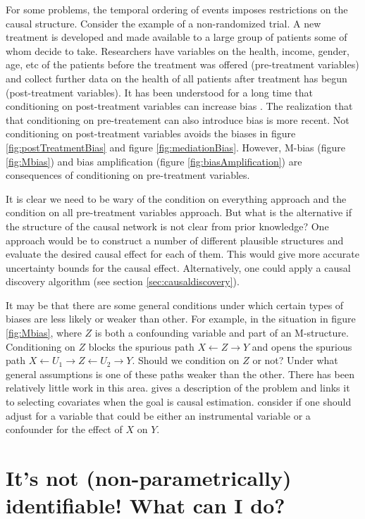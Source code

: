 \documentclass[11pt,a4paper]{article}
\begin{document}
For some problems, the temporal ordering of events imposes restrictions on the causal structure. Consider the example of a non-randomized trial. A new treatment is developed and made available to a large group of patients some of whom decide to take. Researchers have variables on the health, income, gender, age, etc of the patients before the treatment was offered (pre-treatment variables) and collect further data on the health of all patients after treatment has begun (post-treatment variables). It has been understood for a long time that conditioning on post-treatment variables can increase bias \cite{Rosenbaum1984a}. The realization that that conditioning on pre-treatement can also introduce bias is more recent. Not conditioning on post-treatment variables avoids the biases in figure \ref{fig:postTreatmentBias} and figure \ref{fig:mediationBias}. However, M-bias (figure \ref{fig:Mbias}) and bias amplification (figure \ref{fig:biasAmplification}) are consequences of conditioning on pre-treatment variables. 


It is clear we need to be wary of the condition on everything approach and the condition on all pre-treatment variables approach. But what is the alternative if the structure of the causal network is not clear from prior knowledge? One approach would be to construct a number of different plausible structures and evaluate the desired causal effect for each of them. This would give more accurate uncertainty bounds for the causal effect. Alternatively, one could apply a causal discovery algorithm (see section \ref{sec:causaldiscovery}). 

It may be that there are some general conditions under which certain types of biases are less likely or weaker than other. For example, in the situation in figure \ref{fig:Mbias}, where $Z$ is both a confounding variable and part of an M-structure. Conditioning on $Z$ blocks the spurious path $X \leftarrow Z \rightarrow Y$ and opens the spurious path $X \leftarrow U_{1} \rightarrow Z \leftarrow U_{2} \rightarrow Y$. Should we condition on $Z$ or not? Under what general assumptions is one of these paths weaker than the other. There has been relatively little work in this area. \cite{Vansteelandt2012} gives a description of the problem and links it to selecting covariates when the goal is causal estimation. \cite{Myers2011, Pearl2012b} consider if one should adjust for a variable that could be either an instrumental variable or a confounder for the effect of $X$ on $Y$. 


\section{It's not (non-parametrically) identifiable! What can I do?}
\end{document}
